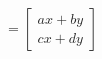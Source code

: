 \documentclass[preview]{standalone}
\begin{document}
\begin{align*}
= \begin{bmatrix} ax + by \\ cx + dy \end{bmatrix}
\end{align*}
\end{document}
